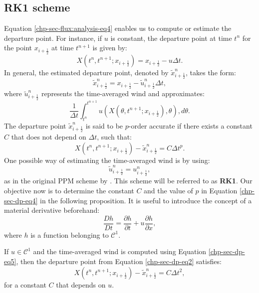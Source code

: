 \subsection{RK1 scheme}
Equation \eqref{chp-sec-flux:analysis-eq4} enables us to compute or estimate the departure point.
For instance, if $u$ is constant, the departure point at time $t^n$ for the point $x_{i+\frac{1}{2}}$ at time $t^{n+1}$ is given by:
\begin{equation}
	\label{chp-sec-dp-eq1}
	X(t^n,t^{n+1};x_{i+\frac{1}{2}}) = x_{i+\frac{1}{2}} - u\Delta t.
\end{equation}
In general, the estimated departure point, denoted by $\tilde{x}_{i+\frac{1}{2}}^n$, takes the form:
\begin{equation}
	\label{chp-sec-dp-eq2}
	\tilde{x}_{i+\frac{1}{2}}^n = x_{i+\frac{1}{2}} - \tilde{u}^{n}_{i+\frac{1}{2}}\Delta t,
\end{equation}
where $\tilde{u}^{n}_{i+\frac{1}{2}}$ represents the time-averaged wind and approximates:
\begin{equation}
	\label{chp-sec-dp-eq3}
	\frac{1}{\Delta t}\int_{t^n}^{t^{n+1}}u(X(\theta,t^{n+1};x_{i+\frac{1}{2}}),\theta) ,d\theta.
\end{equation}
The departure point $\tilde{x}_{i+\frac{1}{2}}^n$ is said to be $p$-order accurate if there exists a constant $C$ that does not depend on $\Delta t$, such that:
\begin{equation}
	\label{chp-sec-dp-eq4}
	X(t^n,t^{n+1};x_{i+\frac{1}{2}}) - \tilde{x}_{i+\frac{1}{2}}^n = C\Delta t^p.
\end{equation}
One possible way of estimating the time-averaged wind is by using:
\begin{equation}
	\label{chp-sec-dp-eq5}
	\tilde{u}^n_{i+\frac{1}{2}} = u^n_{i+\frac{1}{2}},
\end{equation}
as in the original PPM scheme by \citet{colella:1984}. This scheme will be referred to as \textbf{RK1}.
Our objective now is to determine the constant $C$ and the value of $p$ in Equation \eqref{chp-sec-dp-eq4}
in the following proposition. It is useful to introduce the concept of a material derivative beforehand:
\begin{equation*}
	\frac{Dh}{Dt} = \frac{\partial h}{\partial t} + u\frac{\partial h}{\partial x},
\end{equation*}
where $h$ is a function belonging to $\mathcal{C}^1$.
\begin{prop}
	\label{chp-sec-flux:dp_euler}
	If $u\in \mathcal{C}^1$ and the time-averaged wind is computed using Equation \eqref{chp-sec-dp-eq5}, then the departure point from Equation \eqref{chp-sec-dp-eq2} satisfies:
	\begin{equation}
		X(t^n,t^{n+1};x_{i+\frac{1}{2}}) - \tilde{x}_{i+\frac{1}{2}}^n = C\Delta t^2,
	\end{equation}
	for a constant $C$ that depends on $u$.
\end{prop}
